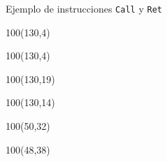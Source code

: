 \documentclass[aspectratio=169]{beamer}
\begin{document}
\begin{frame}[fragile]{Ejemplo de instrucciones \texttt{Call} y \texttt{Ret}}
    \begin{textblock}{100}(130,4)   \end{textblock}
    \begin{textblock}{100}(130,4)   \end{textblock}
    \begin{textblock}{100}(130,19)  \end{textblock}
    \begin{textblock}{100}(130,14)  \end{textblock}
    \begin{textblock}{100}(50,32)   \end{textblock}
    \begin{textblock}{100}(48,38)   \end{textblock}

\end{frame}
\end{document}
